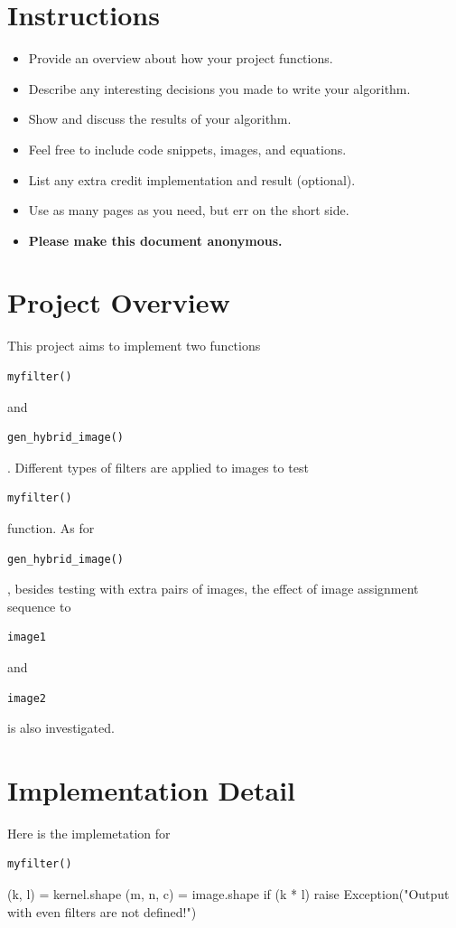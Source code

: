 \section*{Instructions}
\begin{itemize}
  \item Provide an overview about how your project functions. 
  \item Describe any interesting decisions you made to write your algorithm.
  \item Show and discuss the results of your algorithm.
  \item Feel free to include code snippets, images, and equations.
  \item List any extra credit implementation and result (optional).
  \item Use as many pages as you need, but err on the short side.
  \item \textbf{Please make this document anonymous.}
\end{itemize}

\section*{Project Overview}

This project aims to implement two functions \begin{verbatim}myfilter()\end{verbatim} and \begin{verbatim}gen_hybrid_image()\end{verbatim}. Different types of filters are applied to images to test \begin{verbatim}myfilter()\end{verbatim} function. As for \begin{verbatim}gen_hybrid_image()\end{verbatim}, besides testing with extra pairs of images, the effect of image assignment sequence to \begin{verbatim}image1\end{verbatim} and \begin{verbatim}image2\end{verbatim} is also investigated.

\section*{Implementation Detail}

Here is the implemetation for \begin{verbatim}myfilter()\end{verbatim}
\begin{python}

\end{python}
    (k, l) = kernel.shape
    (m, n, c) = image.shape
    if (k * l) %
        raise Exception("Output with even filters are not defined!")

